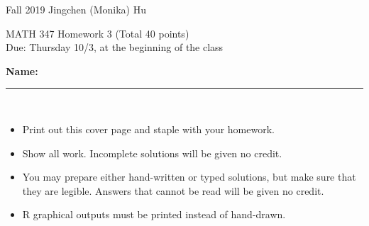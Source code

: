 \documentclass[11pt]{article}
\begin{document}
\enlargethispage{\baselineskip}

Fall 2019 \hfill Jingchen (Monika) Hu\\

\begin{center}
{\huge MATH 347 Homework 3 (Total 40 points)}	\\
Due: Thursday 10/3, at the beginning of the class
\end{center}
\vspace{0.5cm}

\textbf{Name:} \rule{6cm}{0.5pt}\\


{\bf
\begin{itemize}
\item Print out this cover page and staple with your homework.
\item Show all work. Incomplete solutions will be given no credit.
\item You may prepare either hand-written or typed solutions,
but make sure that they are legible.
Answers that cannot be read will be given no credit.
\item R graphical outputs must be printed instead of hand-drawn.

\end{itemize}
}

\end{document}
